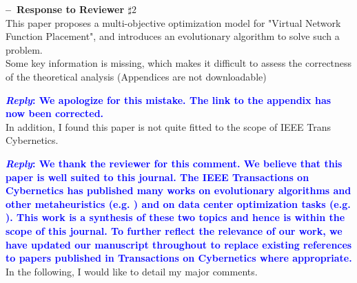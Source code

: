 
\noindent\textbf{--\ Response to Reviewer $\sharp2$}\\

\textsf{This paper proposes a multi-objective optimization model for "Virtual Network Function Placement", and introduces an evolutionary algorithm to solve such a problem.}\\

\textsf{Some key information is missing, which makes it difficult to assess the correctness of the theoretical analysis (Appendices are not downloadable)}

\textcolor{blue}{\textbf{\textit{Reply}: We apologize for this mistake. The link to the appendix has now been corrected.}}\\

\textsf{In addition, I found this paper is not quite fitted to the scope of IEEE Trans Cybernetics.}

\textcolor{blue}{\textbf{\textit{Reply}: We thank the reviewer for this comment. We believe that this paper is well suited to this journal. The IEEE Transactions on Cybernetics has published many works on evolutionary algorithms and other metaheuristics (e.g. \cite{TODO}) and on data center optimization tasks (e.g. \cite{TODO}). This work is a synthesis of these two topics and hence is within the scope of this journal. To further reflect the relevance of our work, we have updated our manuscript throughout to replace existing references to papers published in Transactions on Cybernetics where appropriate.}}\\


\textsf{In the following, I would like to detail my major comments.}


